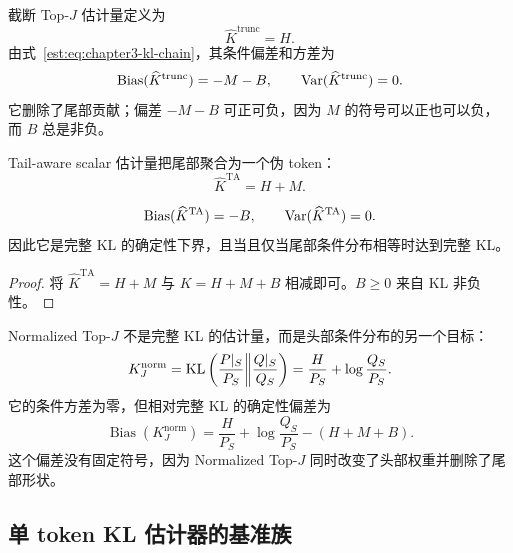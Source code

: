 截断 Top-$J$ 估计量定义为
\begin{equation*}
 \widehat K^{\mathrm{trunc}}=H.
\end{equation*}
由式~\eqref{est:eq:chapter3-kl-chain}，其条件偏差和方差为
\begin{equation}
 \operatorname{Bias}(\widehat K^{\mathrm{trunc}})=-M-B,
 \qquad
 \operatorname{Var}(\widehat K^{\mathrm{trunc}})=0.
 \label{est:eq:chapter3-trunc-bias-var}
\end{equation}
它删除了尾部贡献；偏差 $-M-B$ 可正可负，因为 $M$ 的符号可以正也可以负，而 $B$ 总是非负。

Tail-aware scalar 估计量把尾部聚合为一个伪 token：
\begin{equation*}
 \widehat K^{\mathrm{TA}}=H+M.
\end{equation*}

\begin{proposition}
\label{est:prop:chapter3-ta-scalar}
\begin{equation*}
 \operatorname{Bias}(\widehat K^{\mathrm{TA}})=-B,
 \qquad
 \operatorname{Var}(\widehat K^{\mathrm{TA}})=0.
\end{equation*}
因此它是完整 KL 的确定性下界，且当且仅当尾部条件分布相等时达到完整 KL。
\end{proposition}

\begin{proof}
将 $\widehat K^{\mathrm{TA}}=H+M$ 与 $K=H+M+B$ 相减即可。$B\geq0$ 来自 KL 非负性。
\end{proof}

Normalized Top-$J$ 不是完整 KL 的估计量，而是头部条件分布的另一个目标：
\begin{equation*}
 K^{\mathrm{norm}}_J
 =\operatorname{KL}\left(\frac{P|_S}{P_S}\middle\|\frac{Q|_S}{Q_S}\right)
 =\frac{H}{P_S}+\log\frac{Q_S}{P_S}.
\end{equation*}
它的条件方差为零，但相对完整 KL 的确定性偏差为
\begin{equation}
 \operatorname{Bias}(K^{\mathrm{norm}}_J)
 =\frac{H}{P_S}+\log\frac{Q_S}{P_S}-(H+M+B).
 \label{est:eq:chapter3-normalized-bias}
\end{equation}
这个偏差没有固定符号，因为 Normalized Top-$J$ 同时改变了头部权重并删除了尾部形状。

\subsection{单 token KL 估计器的基准族}

